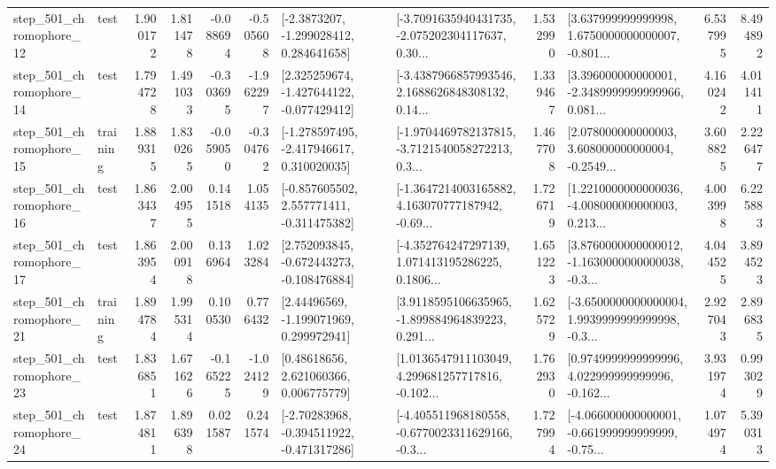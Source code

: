 \begin{tabular}{llrrrrllrlrr}
  step\_501\_chromophore\_12 &      test &      1.900172 &    1.811478 &     -0.088694 & -0.505608 &     [-2.3873207, -1.299028412, 0.284641658] &  [-3.7091635940431735, -2.075202304117637, 0.30... &       1.532990 &  [3.637999999999998, 1.6750000000000007, -0.801... &            6.537995 &          8.494892 \\
  step\_501\_chromophore\_14 &      test &      1.794728 &    1.491033 &     -0.303695 & -1.962297 &   [2.325259674, -1.427644122, -0.077429412] &  [-3.4387966857993546, 2.1688626848308132, 0.14... &       1.339467 &  [3.396000000000001, -2.3489999999999966, 0.081... &            4.160242 &          4.011411 \\
  step\_501\_chromophore\_15 &  training &      1.889315 &    1.830265 &     -0.059050 & -0.304762 &   [-1.278597495, -2.417946617, 0.310020035] &  [-1.9704469782137815, -3.7121540058272213, 0.3... &       1.467708 &  [2.078000000000003, 3.608000000000004, -0.2549... &            3.608825 &          2.226477 \\
  step\_501\_chromophore\_16 &      test &      1.863437 &    2.004955 &      0.141518 &  1.054135 &   [-0.857605502, 2.557771411, -0.311475382] &  [-1.3647214003165882, 4.163070777187942, -0.69... &       1.726719 &  [1.2210000000000036, -4.008000000000003, 0.213... &            4.003998 &          6.225883 \\
  step\_501\_chromophore\_17 &      test &      1.863954 &    2.000918 &      0.136964 &  1.023284 &   [2.752093845, -0.672443273, -0.108476884] &  [-4.352764247297139, 1.071413195286225, 0.1806... &       1.651223 &  [3.8760000000000012, -1.1630000000000038, -0.3... &            4.044525 &          3.894523 \\
  step\_501\_chromophore\_21 &  training &      1.894784 &    1.995314 &      0.100530 &  0.776432 &     [2.44496569, -1.199071969, 0.299972941] &  [3.9118595106635965, -1.899884964839223, 0.291... &       1.625729 &  [-3.6500000000000004, 1.9939999999999998, -0.3... &            2.927043 &          2.896835 \\
  step\_501\_chromophore\_23 &      test &      1.836851 &    1.671626 &     -0.165225 & -1.024129 &      [0.48618656, 2.621060366, 0.006775779] &  [1.0136547911103049, 4.299681257717816, -0.102... &       1.762930 &  [0.9749999999999996, 4.022999999999996, -0.162... &            3.931974 &          0.993029 \\
  step\_501\_chromophore\_24 &      test &      1.874811 &    1.896398 &      0.021587 &  0.241574 &   [-2.70283968, -0.394511922, -0.471317286] &  [-4.405511968180558, -0.6770023311629166, -0.3... &       1.727994 &  [-4.066000000000001, -0.661999999999999, -0.75... &            1.074974 &          5.390313 \\

\end{tabular}

